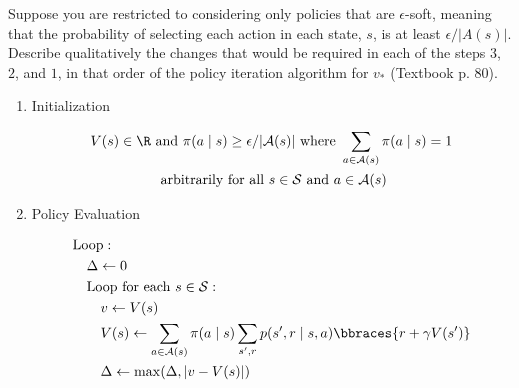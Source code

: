 
\begin{exercise}[Exercise 4.6]

Suppose you are restricted to considering only policies that are $\epsilon$-soft, meaning that the probability of selecting each action in each state, $s$, is at least $\epsilon / |A(s)|$.
Describe qualitatively the changes that would be required in each of the steps $3$, $2$, and $1$, in that order of the policy iteration algorithm for $v_\ast$ (Textbook p. 80).

\end{exercise}


\begin{solution}

\phantom{}

\begin{tcolorbox}[title = Policy Iteration (using iterative policy evaluation) for estimating $\pi \approx \pi_\ast$]

    \begin{enumerate}[label = \arabic*.]

        \item Initialization

        \begin{multline*}
            V(s) \in \R ~\text{and}~ \pi(a \mid s) \geq \epsilon / |\mathcal A(s)| ~\text{where}~ \sum_{a \in \mathcal A(s)} \pi(a \mid s) = 1 \\
            ~\text{arbitrarily for all}~ s \in \mathcal S ~\text{and}~ a \in \mathcal A(s)
        \end{multline*}

        \item Policy Evaluation
        
        \begin{align*}
            & \text{Loop}: \\
            & \quad \Delta \leftarrow 0 \\
            & \quad \text{Loop for each $s \in \mathcal S$}: \\
            & \quad \quad v \leftarrow V(s) \\
            & \quad \quad V(s) \leftarrow \sum_{a \in \mathcal A(s)} \pi(a \mid s) \sum_{s^\prime, r} p(s^\prime, r \mid s, a) \bbraces{r + \gamma V(s^\prime)} \\
            & \quad \quad \Delta \leftarrow \max(\Delta, |v - V(s)|)
        \end{align*}


\end{enumerate}
\end{tcolorbox}
\end{solution}
